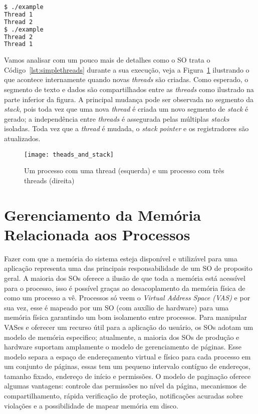 \begin{lstlisting}[frame=single,
                   language=bash,
                   caption={Saída do exemplo de threads},
                   label={lst:simpleThreadOutput}]
$ ./example 
Thread 1 
Thread 2
$ ./example
Thread 2 
Thread 1
\end{lstlisting}

Vamos analisar com um pouco mais de detalhes como o SO trata o
Código~\ref{lst:simplethreads} durante a sua execução, veja a
Figura~\ref{fig:stack_threads} ilustrando o que acontece internamente quando
novas \emph{threads} são criadas. Como esperado, o segmento de texto e dados
são compartilhados entre as \emph{threads} como ilustrado na parte inferior da
figura. A principal mudança pode ser observada no segmento da \emph{stack},
pois toda vez que uma nova \emph{thread} é criada um novo segmento de
\emph{stack} é gerado; a independência entre \emph{threads} é assegurada pelas
múltiplas \emph{stacks} isoladas. Toda vez que a \emph{thread} é mudada, o
\emph{stack pointer} e os registradores são atualizados.

\begin{figure}[!h]
  \centering
  \texttt{[image: theads\_and\_stack]} 
  \caption{Um processo com uma thread (esquerda) e um processo com três threads (direita)}
  \label{fig:stack_threads} 
\end{figure}

\section{Gerenciamento da Memória Relacionada aos Processos}

Fazer com que a memória do sistema esteja disponível e utilizável para uma
aplicação representa uma das principais responsabilidade de um SO de proposito
geral. A maioria dos SOs oferece a ilusão de que toda a memória está acessível
para o processo, isso é possível graças ao desacoplamento da memória física de
como um processo a vê. Processos só veem o \emph{Virtual Address Space (VAS)} e
por sua vez, esse é mapeado por um SO (com auxílio de hardware) para uma
memória física garantindo um bom isolamento entre processos. Para manipular
VASes e oferecer um recurso útil para a aplicação do usuário, os SOs adotam um
modelo de memória especifico; atualmente, a maioria dos SOs de produção e
hardware suportam amplamente o modelo de gerenciamento de páginas.  Esse modelo
separa a espaço de endereçamento virtual e físico para cada processo em um
conjunto de páginas, essas tem um pequeno intervalo contíguo de endereços,
tamanho fixado, endereço de início e permissões. O modelo de paginação oferece
algumas vantagens: controle das permissões no nível da página, mecanismos de
compartilhamento, rápida verificação de proteção, notificações acuradas sobre
violações e a possibilidade de mapear memória em disco.

